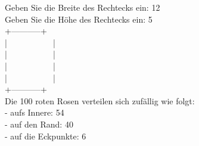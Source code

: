 \documentclass[ngerman,11pt]{article}
\begin{document}
\begin{tcolorbox}[colback=white,colframe=black,fontupper=\ttfamily]
Geben Sie die Breite des Rechtecks ein: 12\\
Geben Sie die Höhe des Rechtecks ein: 5\\
+-----------+\\
|\ \ \ \ \ \ \ \ \ \ \ |\\
|\ \ \ \ \ \ \ \ \ \ \ |\\
|\ \ \ \ \ \ \ \ \ \ \ |\\
|\ \ \ \ \ \ \ \ \ \ \ |\\
+-----------+\\
Die 100 roten Rosen verteilen sich zufällig wie folgt:\\
- aufs Innere: 54\\
- auf den Rand: 40\\
- auf die Eckpunkte: 6
\end{tcolorbox}
\end{document}
